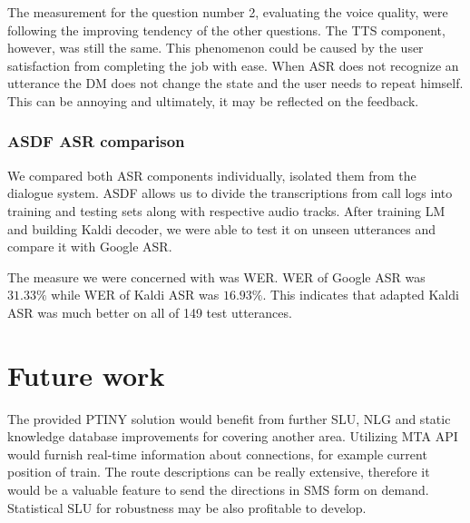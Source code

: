 The measurement for the question number 2, evaluating the voice quality, were following the improving tendency of the other questions.
The \ac{TTS} component, however, was still the same.
This phenomenon could be caused by the user satisfaction from completing the job with ease.
When \ac{ASR} does not recognize an utterance the \ac{DM} does not change the state and the user needs to repeat himself.
This can be annoying and ultimately, it may be reflected on the feedback.

\subsubsection{\ac{ASDF} \ac{ASR} comparison}

We compared both \ac{ASR} components individually, isolated them from the dialogue system.
\ac{ASDF} allows us to divide the transcriptions from call logs into training and testing sets along with respective audio tracks.
After training \ac{LM} and building Kaldi decoder, we were able to test it on unseen utterances and compare it with Google \ac{ASR}.

The measure we were concerned with was \acf{WER}.
\ac{WER} of Google \ac{ASR} was $31.33\%$ while \ac{WER} of Kaldi \ac{ASR} was $16.93\%$.
This indicates that adapted Kaldi \ac{ASR} was much better on all of 149 test utterances.

\section{Future work}

The provided \ac{PTINY} solution would benefit from further \ac{SLU}, \ac{NLG}  and static knowledge database improvements for covering another area.
Utilizing \ac{MTA} \ac{API} would furnish real-time information about connections, for example current position of train.
The route descriptions can be really extensive, therefore it would be a valuable feature to send the directions in SMS form on demand.
Statistical \ac{SLU} for robustness may be also profitable to develop.
